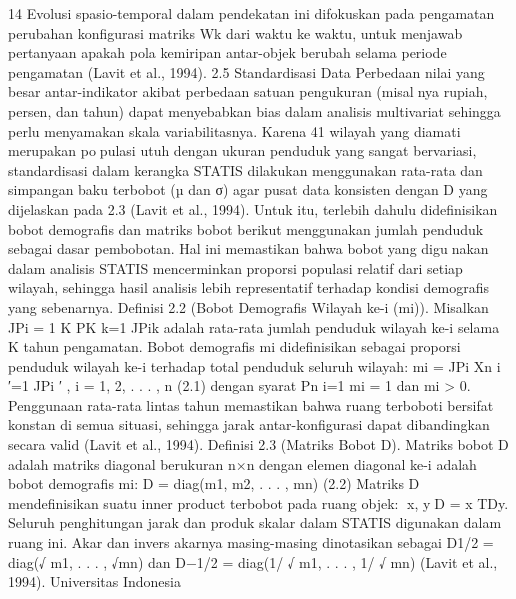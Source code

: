 14
Evolusi spasio-temporal dalam pendekatan ini difokuskan pada pengamatan perubahan
konfigurasi matriks Wk dari waktu ke waktu, untuk menjawab pertanyaan apakah pola
kemiripan antar-objek berubah selama periode pengamatan (Lavit et al., 1994).
2.5 Standardisasi Data
Perbedaan nilai yang besar antar-indikator akibat perbedaan satuan pengukuran (misalnya rupiah, persen, dan tahun) dapat menyebabkan bias dalam analisis multivariat sehingga
perlu menyamakan skala variabilitasnya. Karena 41 wilayah yang diamati merupakan populasi utuh dengan ukuran penduduk yang sangat bervariasi, standardisasi dalam kerangka
STATIS dilakukan menggunakan rata-rata dan simpangan baku terbobot (µ dan σ) agar
pusat data konsisten dengan D yang dijelaskan pada 2.3 (Lavit et al., 1994). Untuk itu,
terlebih dahulu didefinisikan bobot demografis dan matriks bobot berikut menggunakan
jumlah penduduk sebagai dasar pembobotan. Hal ini memastikan bahwa bobot yang digunakan dalam analisis STATIS mencerminkan proporsi populasi relatif dari setiap wilayah,
sehingga hasil analisis lebih representatif terhadap kondisi demografis yang sebenarnya.
Definisi 2.2 (Bobot Demografis Wilayah ke-i (mi)). Misalkan JPi =
1
K
PK
k=1 JPik adalah
rata-rata jumlah penduduk wilayah ke-i selama K tahun pengamatan. Bobot demografis
mi didefinisikan sebagai proporsi penduduk wilayah ke-i terhadap total penduduk seluruh
wilayah:
mi =
JPi
Xn
i
′=1
JPi
′
, i = 1, 2, . . . , n (2.1)
dengan syarat Pn
i=1 mi = 1 dan mi > 0. Penggunaan rata-rata lintas tahun memastikan
bahwa ruang terboboti bersifat konstan di semua situasi, sehingga jarak antar-konfigurasi
dapat dibandingkan secara valid (Lavit et al., 1994).
Definisi 2.3 (Matriks Bobot D). Matriks bobot D adalah matriks diagonal berukuran n×n
dengan elemen diagonal ke-i adalah bobot demografis mi:
D = diag(m1, m2, . . . , mn) (2.2)
Matriks D mendefinisikan suatu inner product terbobot pada ruang objek: ⟨x, y⟩D =
x
TDy. Seluruh penghitungan jarak dan produk skalar dalam STATIS digunakan
dalam ruang ini. Akar dan invers akarnya masing-masing dinotasikan sebagai D1/2 =
diag(√
m1, . . . , √mn) dan D−1/2 = diag(1/
√
m1, . . . , 1/
√
mn) (Lavit et al., 1994).
Universitas Indonesia

